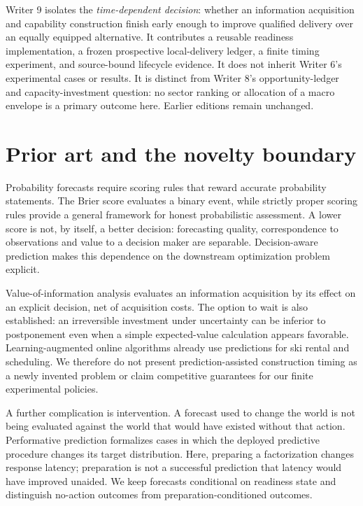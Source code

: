 \documentclass[11pt,a4paper]{article}
\begin{document}
Writer 9 isolates the \emph{time-dependent decision}: whether an information acquisition and capability construction finish early enough to improve qualified delivery over an equally equipped alternative. It contributes a reusable readiness implementation, a frozen prospective local-delivery ledger, a finite timing experiment, and source-bound lifecycle evidence. It does not inherit Writer 6's experimental cases or results. It is distinct from Writer 8's opportunity-ledger and capacity-investment question: no sector ranking or allocation of a macro envelope is a primary outcome here. Earlier editions remain unchanged.

\section{Prior art and the novelty boundary}
Probability forecasts require scoring rules that reward accurate probability statements. The Brier score evaluates a binary event, while strictly proper scoring rules provide a general framework for honest probabilistic assessment. \citep{brier1950,gneiting2007} A lower score is not, by itself, a better decision: forecasting quality, correspondence to observations and value to a decision maker are separable. \citep{murphy1993} Decision-aware prediction makes this dependence on the downstream optimization problem explicit. \citep{elmachtoub2022}

Value-of-information analysis evaluates an information acquisition by its effect on an explicit decision, net of acquisition costs. \citep{howard1966} The option to wait is also established: an irreversible investment under uncertainty can be inferior to postponement even when a simple expected-value calculation appears favorable. \citep{mcdonald1986} Learning-augmented online algorithms already use predictions for ski rental and scheduling. \citep{purohit2018} We therefore do not present prediction-assisted construction timing as a newly invented problem or claim competitive guarantees for our finite experimental policies.

A further complication is intervention. A forecast used to change the world is not being evaluated against the world that would have existed without that action. Performative prediction formalizes cases in which the deployed predictive procedure changes its target distribution. \citep{perdomo2020} Here, preparing a factorization changes response latency; preparation is not a successful prediction that latency would have improved unaided. We keep forecasts conditional on readiness state and distinguish no-action outcomes from preparation-conditioned outcomes.
\end{document}
